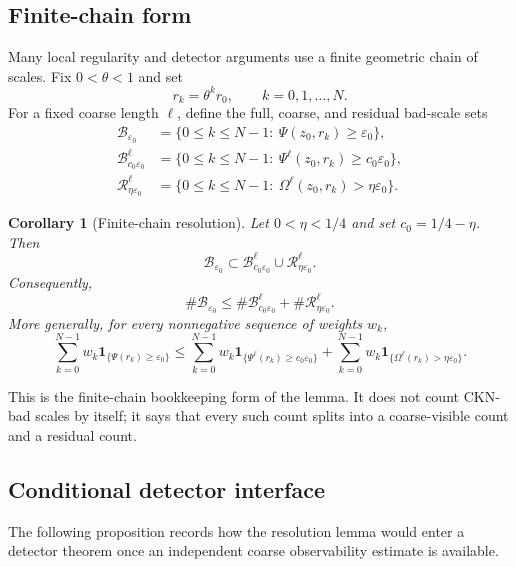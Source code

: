 \documentclass[11pt]{article}
\numberwithin{equation}{section}
\newtheorem{corollary}[theorem]{Corollary}
\newcommand{\eps}{\varepsilon}
\newcommand{\one}{\mathbf 1}
\begin{document}
\subsection{Finite-chain form}

Many local regularity and detector arguments use a finite geometric chain of scales.  Fix $0<\theta<1$ and set
\[
r_k=\theta^k r_0,
\qquad k=0,1,\dots,N.
\]
For a fixed coarse length $\ell$, define the full, coarse, and residual bad-scale sets
\begin{align*}
\mathcal B_{\eps_0}&=\{0\le k\le N-1:\ \Psi(z_0,r_k)\ge\eps_0\},\\
\mathcal B^\ell_{c_0\eps_0}&=\{0\le k\le N-1:\ \Psi^\ell(z_0,r_k)\ge c_0\eps_0\},\\
\mathcal R^\ell_{\eta\eps_0}&=\{0\le k\le N-1:\ \Omega^\ell(z_0,r_k)>\eta\eps_0\}.
\end{align*}

\begin{corollary}[Finite-chain resolution]\label{cor:finite-chain}
Let $0<\eta<1/4$ and set $c_0=1/4-\eta$.  Then
\begin{equation}\label{eq:bad-set-inclusion}
\mathcal B_{\eps_0}\subset
\mathcal B^\ell_{c_0\eps_0}\cup \mathcal R^\ell_{\eta\eps_0}.
\end{equation}
Consequently,
\begin{equation}\label{eq:bad-set-count}
\#\mathcal B_{\eps_0}
\le
\#\mathcal B^\ell_{c_0\eps_0}+
\#\mathcal R^\ell_{\eta\eps_0}.
\end{equation}
More generally, for every nonnegative sequence of weights $w_k$,
\begin{equation}\label{eq:weighted-bad-set}
\sum_{k=0}^{N-1}w_k\one_{\{\Psi(r_k)\ge\eps_0\}}
\le
\sum_{k=0}^{N-1}w_k\one_{\{\Psi^\ell(r_k)\ge c_0\eps_0\}}
+
\sum_{k=0}^{N-1}w_k\one_{\{\Omega^\ell(r_k)>\eta\eps_0\}}.
\end{equation}
\end{corollary}

This is the finite-chain bookkeeping form of the lemma.  It does not count CKN-bad scales by itself; it says that every such count splits into a coarse-visible count and a residual count.

\subsection{Conditional detector interface}

The following proposition records how the resolution lemma would enter a detector theorem once an independent coarse observability estimate is available.
\end{document}
